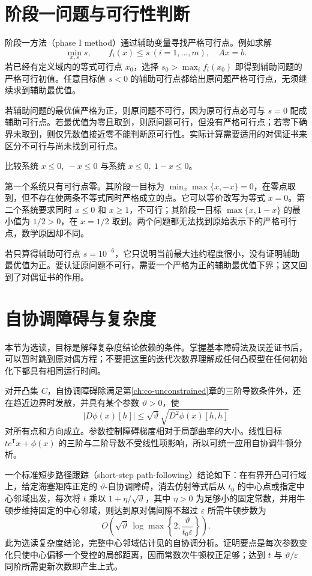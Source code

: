 \documentclass[UTF8,12pt,a4paper,fontset=fandol]{ctexbook}
\begin{document}
\section{阶段一问题与可行性判断}

阶段一方法（phase I method）通过辅助变量寻找严格可行点。例如求解
\[
 \min_{x,s}s,\qquad f_i(x)\leq s\ (i=1,\ldots,m),\quad Ax=b.
\]
若已经有定义域内的等式可行点 $x_0$，选择 $s_0>\max_i f_i(x_0)$ 即得到辅助问题的严格可行初值。任意目标值 $s<0$ 的辅助可行点都给出原问题严格可行点，无须继续求到辅助最优值。

若辅助问题的最优值严格为正，则原问题不可行，因为原可行点必可与 $s=0$ 配成辅助可行点。若最优值为零且取到，则原问题可行，但没有严格可行点；若零下确界未取到，则仅凭数值接近零不能判断原可行性。实际计算需要适用的对偶证书来区分不可行与尚未找到可行点。

\begin{example}[阶段一中零与正数的区别]
比较系统 $x\leq0,\ -x\leq0$ 与系统 $x\leq0,\ 1-x\leq0$。
\end{example}
\begin{solve}
第一个系统只有可行点零。其阶段一目标为 $\min_x\max\{x,-x\}=0$，在零点取到，但不存在使两条不等式同时严格成立的点。它可以等价改写为等式 $x=0$。第二个系统要求同时 $x\leq0$ 和 $x\geq1$，不可行；其阶段一目标 $\max\{x,1-x\}$ 的最小值为 $1/2>0$，在 $x=1/2$ 取到。两个问题都无法找到原始表示下的严格可行点，数学原因却不同。
\end{solve}

若只算得辅助可行点 $s=10^{-6}$，它只说明当前最大违约程度很小，没有证明辅助最优值为正。要认证原问题不可行，需要一个严格为正的辅助最优值下界；这又回到了对偶证书的作用。

\section{自协调障碍与复杂度}

本节为选读，目标是解释复杂度结论依赖的条件。掌握基本障碍法及误差证书后，可以暂时跳到原对偶方程；不要把这里的迭代次数界理解成任何凸模型在任何初始化下都具有相同运行时间。

对开凸集 $C$，自协调障碍除满足第\ref{ch:co-unconstrained}章的三阶导数条件外，还在趋近边界时发散，并具有某个参数 $\vartheta>0$，使
\[
 |D\phi(x)[h]|\leq\sqrt{\vartheta}\sqrt{D^2\phi(x)[h,h]}
\]
对所有点和方向成立。参数控制障碍梯度相对于局部曲率的大小。线性目标 $t c^{\mathsf T}x+\phi(x)$ 的三阶与二阶导数不受线性项影响，所以可统一应用自协调牛顿分析。

一个标准短步路径跟踪（short-step path-following）结论如下：在有界开凸可行域上，给定海塞矩阵正定的 $\vartheta$-自协调障碍，消去仿射等式后从 $t_0$ 的中心点或指定中心邻域出发，每次将 $t$ 乘以 $1+\eta/\sqrt\vartheta$，其中 $\eta>0$ 为足够小的固定常数，并用牛顿步维持固定的中心邻域，则达到原对偶间隙不超过 $\varepsilon$ 所需牛顿步数为
\[
 O\!\left(\sqrt\vartheta\,
 \log\max\left\{2,\frac{\vartheta}{t_0\varepsilon}\right\}\right).
\]
此为选读复杂度结论，完整中心邻域估计见\cite{boyd-vandenberghe}的自协调分析。证明要点是每次参数变化只使中心偏移一个受控的局部距离，因而常数次牛顿校正足够；达到 $t$ 与 $\vartheta/\varepsilon$ 同阶所需更新次数即产生上式。
\end{document}

